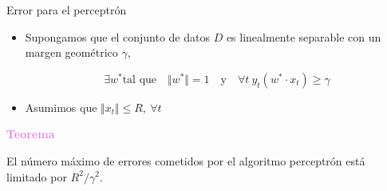 \documentclass[11pt]{beamer}
\begin{document}
\begin{frame}{Error para el perceptr\'on}
\small{
\begin{itemize}
	\item Supongamos que el conjunto de datos $D$ es linealmente separable con un margen geom\'etrico $\gamma$,
	
	\[
	\exists w^{*}  \text{tal que} \quad \Vert w^{*} \Vert = 1 \quad \text{y}\quad  \forall t \ y_t(w^{*}\cdot x_t) \geq \gamma
	\]
	
	\item Asumimos que $\Vert x_t \Vert \leq R,\ \forall t$
\end{itemize}

\vspace{0.3cm}

\textcolor{violet}{\textbf{Teorema}}


El n\'umero m\'aximo de errores cometidos por el algoritmo perceptr\'on est\'a limitado por $R^2/\gamma^2$.
	
	
}
\end{frame}
\end{document}
